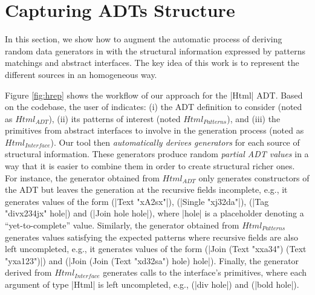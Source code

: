 \section{Capturing ADTs Structure} \label{sec:hrepcont}

\begin{figure*}[t]
  \centering
  
  \caption{Deriving a generator for the ADT |Html| with the structural
    information found in module |M|.}
  \vspace{-5pt}
  \label{fig:hrep}
  \vspace{-5pt}
\end{figure*}

In this section, we show how to augment the automatic process of deriving random
data generators in {\dragen} with the structural information expressed by
patterns matchings and abstract interfaces.
%
The key idea of this work is to represent the different sources in an
homogeneous way.
%
%

Figure \ref{fig:hrep} shows the workflow of our approach for the |Html| ADT.
%
Based on the codebase, the user of \dragenp indicates: (i) the ADT definition to
consider (noted as $Html_{ADT}$), (ii) its patterns of interest (noted
$Html_{Patterns}$), and (iii) the primitives from abstract interfaces to involve
in the generation process (noted as $Html_{Interface}$).
%
%
Our tool then \emph{automatically derives generators} for each source of
structural information.
%
These generators produce random \emph{partial ADT values} in a way that it is
easier to combine them in order to create structural richer ones.
%
For instance, the generator obtained from $Html_{ADT}$ only generates
constructors of the ADT but leaves the generation at the recursive fields
incomplete, e.g., it generates values of the form (|Text "xA2sx"|), (|Single
"xj32da"|), (|Tag "divx234jx" hole|) and (|Join hole hole|), where |hole| is a
placeholder denoting a ``yet-to-complete'' value.
%
%
%
Similarly, the generator obtained from $Html_{Patterns}$ generates values
satisfying the expected patterns where recursive fields are also left
uncompleted, e.g., it generates values of the form (|Join (Text "xxa34") (Text
"yxa123")|) and (|Join (Join (Text "xd32sa") hole) hole|).
%
Finally, the generator derived from $Html_{Interface}$ generates calls to the
interface's primitives, where each argument of type |Html| is left uncompleted,
e.g., (|div hole|) and (|bold hole|).
%

